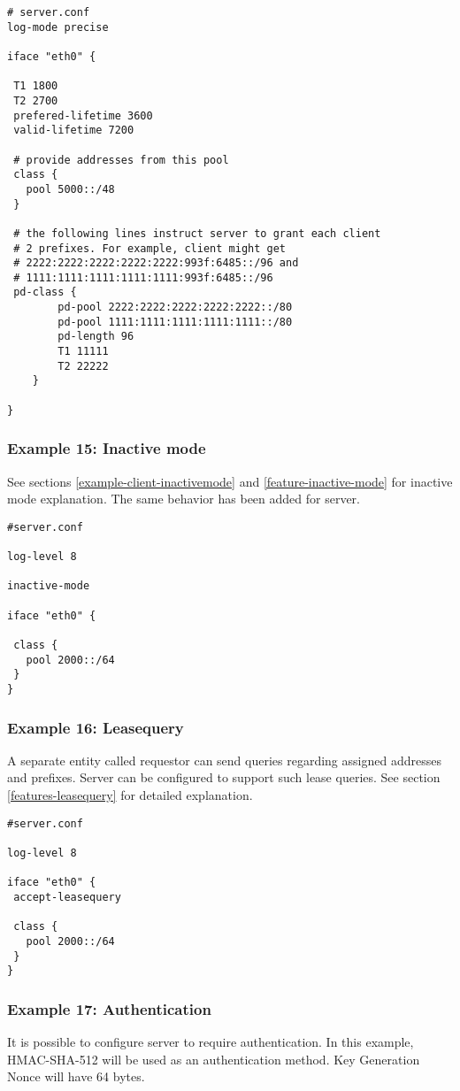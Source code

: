 \begin{lstlisting}
# server.conf
log-mode precise

iface "eth0" {

 T1 1800
 T2 2700
 prefered-lifetime 3600
 valid-lifetime 7200

 # provide addresses from this pool 
 class {
   pool 5000::/48
 }

 # the following lines instruct server to grant each client
 # 2 prefixes. For example, client might get
 # 2222:2222:2222:2222:2222:993f:6485::/96 and 
 # 1111:1111:1111:1111:1111:993f:6485::/96
 pd-class {
        pd-pool 2222:2222:2222:2222:2222::/80
        pd-pool 1111:1111:1111:1111:1111::/80
        pd-length 96
        T1 11111
        T2 22222
    }
 
}
\end{lstlisting}

\subsubsection{Example 15: Inactive mode}
\label{example-server-inactivemode}
See sections \ref{example-client-inactivemode} and 
\ref{feature-inactive-mode} for inactive mode explanation.
The same behavior has been added for server. 

\begin{lstlisting}
#server.conf

log-level 8

inactive-mode

iface "eth0" {

 class {
   pool 2000::/64
 }
}
\end{lstlisting}

\subsubsection{Example 16: Leasequery}
A separate entity
called requestor can send queries regarding assigned addresses and
prefixes. Server can be configured to support such lease queries. 
See section \ref{features-leasequery} for detailed explanation.

\begin{lstlisting}
#server.conf

log-level 8

iface "eth0" {
 accept-leasequery

 class {
   pool 2000::/64
 }
}
\end{lstlisting}


\subsubsection{Example 17: Authentication}
\label{example-server-auth}
It is possible to configure server to require authentication. In this
example, HMAC-SHA-512 will be used as an authentication method.
Key Generation Nonce will have 64 bytes.

